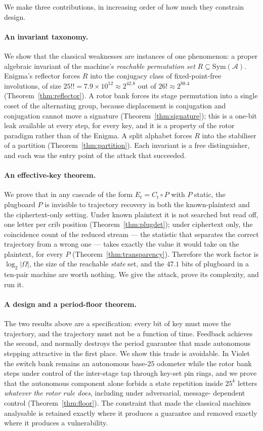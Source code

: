 \documentclass[11pt]{article}
\theoremstyle{definition}
\newcommand{\Sym}{\mathrm{Sym}}
\newcommand{\Om}{\Omega}
\begin{document}
We make three contributions, in increasing order of how much they constrain
design.

\paragraph{An invariant taxonomy.} We show that the classical weaknesses are
instances of one phenomenon: a proper algebraic invariant of the machine's
\emph{reachable permutation set} $R \subseteq \Sym(\mathcal{A})$. Enigma's
reflector forces $R$ into the conjugacy class of fixed-point-free involutions,
of size $25!! = 7.9\times10^{12} \approx 2^{42.8}$ out of $26! \approx 2^{88.4}$
(Theorem~\ref{thm:reflector}). A rotor bank forces its stage permutation into a
single coset of the alternating group, because displacement is conjugation and
conjugation cannot move a signature (Theorem~\ref{thm:signature}); this is a
one-bit leak available at every step, for every key, and it is a property of the
rotor paradigm rather than of the Enigma. A split alphabet forces $R$ into the
stabiliser of a partition (Theorem~\ref{thm:partition}). Each invariant is a
free distinguisher, and each was the entry point of the attack that succeeded.

\paragraph{An effective-key theorem.} We prove that in any cascade of the form
$E_t = C_t \circ P$ with $P$ static, the plugboard $P$ is invisible to trajectory
recovery in both the known-plaintext and the ciphertext-only setting. Under
known plaintext it is not searched but read off, one letter per crib position
(Theorem~\ref{thm:plugdet}); under ciphertext only, the coincidence count of the
reduced stream --- the statistic that separates the correct trajectory from a
wrong one --- takes exactly the value it would take on the plaintext, for every
$P$ (Theorem~\ref{thm:transparency}). Therefore the work factor is
$\log_2|\Om|$, the size of the reachable \emph{state} set, and the $47.1$ bits
of plugboard in a ten-pair machine are worth nothing. We give the attack, prove
its complexity, and run it.

\paragraph{A design and a period-floor theorem.} The two results above are a
specification: every bit of key must move the trajectory, and the trajectory
must not be a function of time. Feedback achieves the second, and normally
destroys the period guarantee that made autonomous stepping attractive in the
first place. We show this trade is avoidable. In Violet the switch bank remains
an autonomous base-$25$ odometer while the rotor bank steps under control of the
inter-stage tap through key-set pin rings, and we prove that the autonomous
component alone forbids a state repetition inside $25^{k}$ letters
\emph{whatever the rotor rule does}, including under adversarial, message-
dependent control (Theorem~\ref{thm:floor}). The constraint that made the
classical machines analysable is retained exactly where it produces a guarantee
and removed exactly where it produces a vulnerability.
\end{document}
